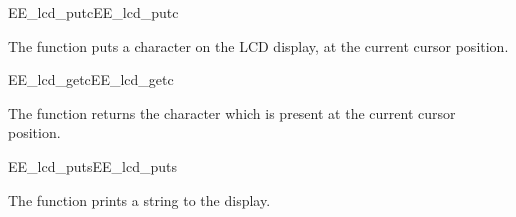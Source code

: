 \begin{function_nopb2}{EE\_lcd\_putc}{EE_lcd_putc}
  
  \begin{fundescription}
    The function puts a character on the LCD display, at the current
    cursor position.
  \end{fundescription}
  
  
  
\end{function_nopb2}


\begin{function_nopb2}{EE\_lcd\_getc}{EE_lcd_getc}
  
  \begin{fundescription}
    The function returns the character which is present at the current
    cursor position.
  \end{fundescription}
  
  
  \begin{funreturn}
  \end{funreturn}
  
\end{function_nopb2}



\begin{function_nopb2}{EE\_lcd\_puts}{EE_lcd_puts}
  
  \begin{fundescription}
    The function prints a string to the display.
  \end{fundescription}
  
  \begin{funparameters}
  \end{funparameters}
  
  
\end{function_nopb2}


